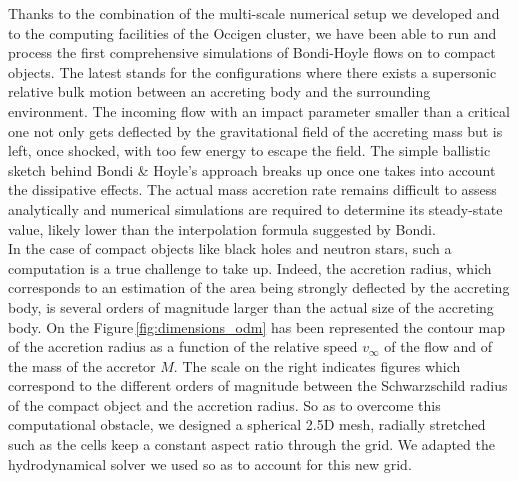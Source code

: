 \documentclass[
    a4paper, 12pt, onecolumn,
]{article}
\begin{document}
Thanks to the combination of the multi-scale numerical setup we developed and to the computing facilities of the Occigen cluster, we have been able to run and process the first comprehensive simulations of Bondi-Hoyle flows on to compact objects. The latest stands for the configurations where there exists a supersonic relative bulk motion between an accreting body and the surrounding environment. The incoming flow with an impact parameter smaller than a critical one not only gets deflected by the gravitational field of the accreting mass but is left, once shocked, with too few energy to escape the field. The simple ballistic sketch behind Bondi \& Hoyle's approach \citep{Bondi1944} breaks up once one takes into account the dissipative effects. The actual mass accretion rate remains difficult to assess analytically and numerical simulations are required to determine its steady-state value, likely lower than the interpolation formula suggested by Bondi.\\
\indent In the case of compact objects like black holes and neutron stars, such a computation is a true challenge to take up. Indeed, the accretion radius, which corresponds to an estimation of the area being strongly deflected by the accreting body, is several orders of magnitude larger than the actual size of the accreting body. On the Figure\,\ref{fig:dimensions_odm} has been represented the contour map of the accretion radius as a function of the relative speed $v_{\infty}$ of the flow and of the mass of the accretor $M$. The scale on the right indicates figures which correspond to the different orders of magnitude between the Schwarzschild radius of the compact object and the accretion radius. So as to overcome this computational obstacle, we designed a spherical 2.5D mesh, radially stretched such as the cells keep a constant aspect ratio through the grid. We adapted the hydrodynamical solver we used so as to account for this new grid. \\
\end{document}
